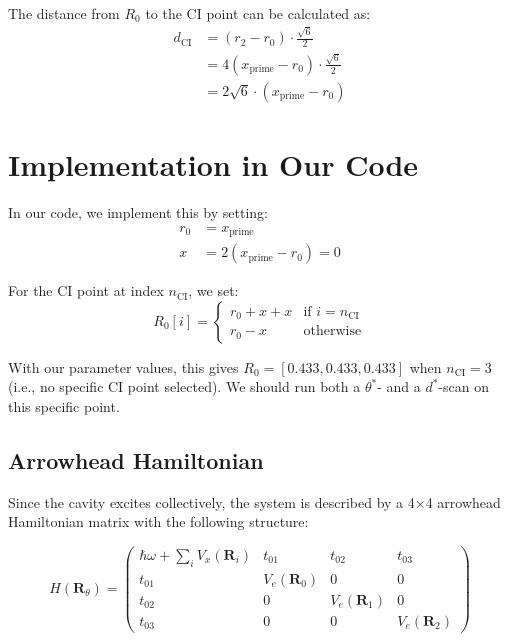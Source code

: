 \documentclass{article}
\begin{document}
The distance from $R_0$ to the CI point can be calculated as:
\begin{align}
d_{\text{CI}} &= (r_2 - r_0) \cdot \frac{\sqrt{6}}{2} \\
&= 4(x_{\text{prime}} - r_0) \cdot \frac{\sqrt{6}}{2} \\
&= 2\sqrt{6} \cdot (x_{\text{prime}} - r_0)
\end{align}

\section{Implementation in Our Code}

In our code, we implement this by setting:
\begin{align}
r_0 &= x_{\text{prime}} \\
x &= 2(x_{\text{prime}} - r_0) = 0
\end{align}

For the CI point at index $n_{\text{CI}}$, we set:
\begin{equation}
R_0[i] = 
\begin{cases}
r_0 + x + x & \text{if } i = n_{\text{CI}} \\
r_0 - x & \text{otherwise}
\end{cases}
\end{equation}

With our parameter values, this gives $R_0 = [0.433, 0.433, 0.433]$ when $n_{\text{CI}} = 3$ (i.e., no specific CI point selected). We should run both a $\theta^*$- and a $d^*$-scan on this specific point.

\subsection{Arrowhead Hamiltonian}

Since the cavity excites collectively, the system is described by a 4×4 arrowhead Hamiltonian matrix with the following structure:

\begin{equation}
H(\bm{R}_{\theta}) = 
\begin{pmatrix}
\hbar\omega + \sum_i V_x(\bm{R}_i) & t_{01} & t_{02} & t_{03} \\
t_{01} & V_e(\bm{R}_0) & 0 & 0 \\
t_{02} & 0 & V_e(\bm{R}_1) & 0 \\
t_{03} & 0 & 0 & V_e(\bm{R}_2)
\end{pmatrix}
\end{equation}
\end{document}

